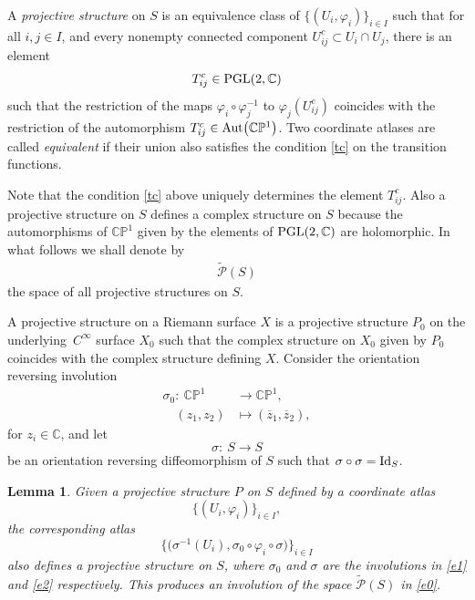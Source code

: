 \documentclass[pdftex]{sigma}
\numberwithin{equation}{section}
\newtheorem{Lemma}[Theorem]{Lemma}
\begin{document}
\begin{Definition}
A {\it projective structure} on $S$ is an equivalence class of %
$\{(U_i,\allowbreak \varphi_i)\}_{i\in I}$ such that for all $i, j \in I$, and every nonempty
connected component $U^c_{ij} \subset U_i\cap U_j$, there is an
element
\begin{equation}\label{tc}
T^c_{ij} \in {\rm PGL}(2,{\mathbb C})
\end{equation}
such that the restriction of the maps $\varphi_i\circ \varphi^{-1}_j$ to $\varphi_j(U^c_{ij})$
coincides with the restriction of the automorphism $T^c_{ij} \in {\rm Aut}\bigl({\mathbb C}{\mathbb P}^1\bigr)$. Two
coordinate atlases are called {\it equivalent} if
their union also satisfies the condition \eqref{tc} on the transition functions.
\end{Definition}

{\samepage Note that the condition \eqref{tc} above uniquely
determines the element $T^c_{ij}$. Also a projective structure on $S$ defines
a complex structure on $S$ because the automorphisms of ${\mathbb C}{\mathbb P}^1$ given by the
elements of ${\rm PGL}(2,{\mathbb C})$ are holomorphic.
In what follows we shall denote by
\begin{gather}\label{e0}
\widetilde{\mathcal P}(S)
\end{gather}
the space of all projective structures on $S$.}

A projective structure on a Riemann surface $X$ is a projective structure $P_0$ on the
underlying~$C^\infty$ surface $X_0$ such that the complex structure on $X_0$ given by $P_0$
coincides with the complex structure defining $X$. Consider the orientation reversing involution
\begin{align}
\sigma_0\colon\ {\mathbb C}{\mathbb P}^1 &\longrightarrow {\mathbb C}{\mathbb P}^1,\nonumber\\
\quad(z_1, z_2) &\longmapsto (\overline{z}_1, \overline{z}_2),\label{e1}
\end{align}
for $z_i \in \mathbb C$, and let
\begin{equation}\label{e2}
\sigma\colon\ S \longrightarrow S
\end{equation}
be an orientation reversing diffeomorphism of $S$ such that $\sigma\circ\sigma = {\rm Id}_S$.

\begin{Lemma}\label{invoproj}
Given a projective structure $P$ on $S$ defined by a coordinate atlas
\[
\{(U_i, \varphi_i)\}_{i\in I},\]
the
corresponding atlas
\[
\big\{\bigl(\sigma^{-1}(U_i), \sigma_0\circ\varphi_i\circ\sigma\bigr)\big\}_{i\in
I}
\] also defines a projective structure on $S$, where $\sigma_0$ and $\sigma$ are the involutions
in \eqref{e1} and \eqref{e2} respectively. This produces
an involution of the space $\widetilde{\mathcal P}(S)$ in \eqref{e0}.
\end{Lemma}
\end{document}
